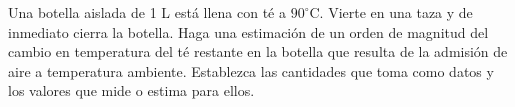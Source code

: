\item Una botella aislada de 1 L está llena con té a $90^\circ\text{C}$. Vierte en una taza y de inmediato cierra la botella. Haga una estimación de un orden de magnitud del cambio en temperatura del té restante en la botella que resulta de la admisión de aire a temperatura ambiente. Establezca las cantidades que toma como datos y los valores que mide o estima para ellos.
